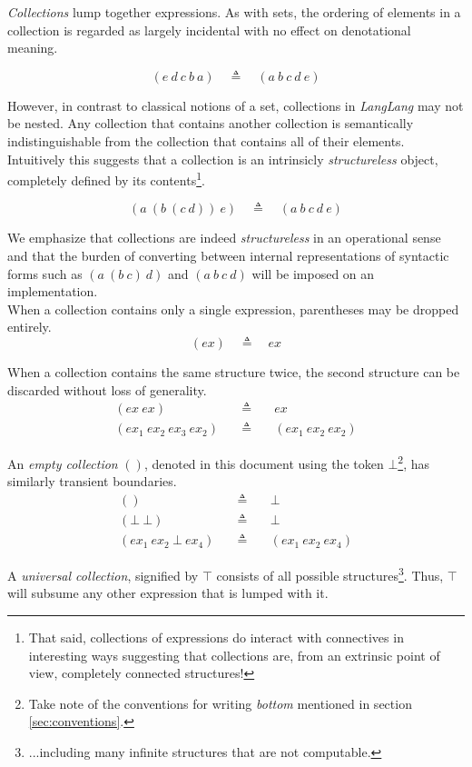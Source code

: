 \documentclass[a4paper,11pt]{article}
\begin{document}
\emph{Collections} lump together expressions.
As with sets, the ordering of elements in a collection is regarded as largely incidental with no effect on denotational meaning.

\[
(e\ d\ c\ b\ a) \quad\triangleq\quad (a\ b\ c\ d\ e)
\]

However, in contrast to classical notions of a set, collections in \textsl{LangLang} may not be nested.
Any collection that contains another collection is semantically indistinguishable from the collection that contains all of their elements.
Intuitively this suggests that a collection is an intrinsicly \emph{structureless} object, completely defined by its contents\footnote{That said, collections of expressions do interact with connectives in interesting ways suggesting that collections are, from an extrinsic point of view, completely connected structures!}.

\[
(a\ (b\ (c\ d))\ e) \quad\triangleq\quad (a\ b\ c\ d\ e)
\]

We emphasize that collections are indeed \emph{structureless} in an operational sense and that the burden of converting between internal representations of syntactic forms
such as $(a\ (b\ c)\ d)$ and $(a\ b\ c\ d)$ will be imposed on an implementation.\\

When a collection contains only a single expression, parentheses may be dropped entirely.
\[
(ex) \quad\triangleq\quad ex
\]

When a collection contains the same structure twice, the second structure can be discarded without loss of generality.
\begin{eqnarray*}
(ex\ ex) \quad&\triangleq&\quad ex \\
(ex_1\ ex_2\ ex_3\ ex_2) \quad&\triangleq&\quad (ex_1\ ex_2\ ex_2)
\end{eqnarray*}

An \emph{empty collection} $()$, denoted in this document using the token $\bot$\footnote{Take note of the conventions for writing \emph{bottom} mentioned in section \ref{sec:conventions}.}, has similarly transient boundaries.
\begin{eqnarray*}
() \quad&\triangleq&\quad \bot \\
(\bot\ \bot) \quad&\triangleq&\quad \bot \\
(ex_1\ ex_2\ \bot\ ex_4) \quad&\triangleq&\quad (ex_1\ ex_2\ ex_4)
\end{eqnarray*}

A \emph{universal collection}, signified by $\top$ consists of all possible structures\footnote{...including many infinite structures that are not computable.}.
Thus, $\top$ will subsume any other expression that is lumped with it.
\end{document}
